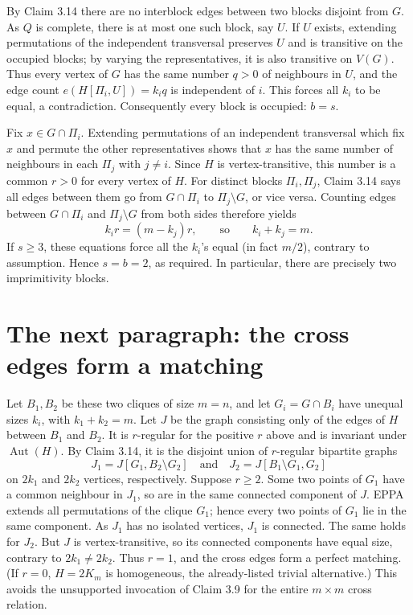 \documentclass[11pt,a4paper]{article}
\begin{document}
By Claim 3.14 there are no interblock edges between two
blocks disjoint from \(G\). As \(Q\) is complete,
there is at most one such block, say \(U\).
If \(U\) exists, extending permutations of the
independent transversal preserves \(U\) and is
transitive on the occupied blocks; by varying the
representatives, it is also transitive on \(V(G)\).
Thus every vertex of \(G\) has the same number
\(q>0\) of neighbours in \(U\), and the edge count
\(e(H[\Pi_i,U])=k_iq\) is independent of \(i\).
This forces all \(k_i\) to be equal, a contradiction.
Consequently every block is occupied: \(b=s\).

Fix \(x\in G\cap\Pi_i\). Extending permutations of an
independent transversal which fix \(x\) and permute the
other representatives shows that \(x\) has the same
number of neighbours in each \(\Pi_j\) with \(j\ne i\).
Since \(H\) is vertex-transitive, this number is a
common \(r>0\) for every vertex of \(H\).
For distinct blocks \(\Pi_i,\Pi_j\), Claim 3.14 says
all edges between them go from \(G\cap\Pi_i\) to
\(\Pi_j\setminus G\), or vice versa. Counting edges
between \(G\cap\Pi_i\) and \(\Pi_j\setminus G\)
from both sides therefore yields
\[
      k_i r=(m-k_j)r,\qquad\text{so}\qquad k_i+k_j=m.
\]
If \(s\ge3\), these equations force all the \(k_i\)'s
equal (in fact \(m/2\)), contrary to assumption.
Hence \(s=b=2\), as required. In particular, there
are precisely two imprimitivity blocks.

\section*{The next paragraph: the cross edges form a matching}

Let \(B_1,B_2\) be these two cliques of size
\(m=n\), and let \(G_i=G\cap B_i\) have unequal
sizes \(k_i\), with \(k_1+k_2=m\).
Let \(J\) be the graph consisting only of the edges
of \(H\) between \(B_1\) and \(B_2\).
It is \(r\)-regular for the positive \(r\) above
and is invariant under \(\operatorname{Aut}(H)\).
By Claim 3.14, it is the disjoint union of
\(r\)-regular bipartite graphs
\[
 J_1=J[G_1,B_2\setminus G_2]
 \quad\text{and}\quad
 J_2=J[B_1\setminus G_1,G_2]
\]
on \(2k_1\) and \(2k_2\) vertices, respectively.
Suppose \(r\ge2\). Some two points of \(G_1\)
have a common neighbour in \(J_1\), so are in
the same connected component of \(J\).
EPPA extends all permutations of the clique \(G_1\);
hence every two points of \(G_1\) lie in the same
component. As \(J_1\) has no isolated vertices,
\(J_1\) is connected. The same holds for \(J_2\).
But \(J\) is vertex-transitive, so its connected
components have equal size, contrary to
\(2k_1\ne2k_2\). Thus \(r=1\), and the
cross edges form a perfect matching.
(If \(r=0\), \(H=2K_m\) is homogeneous,
the already-listed trivial alternative.)
This avoids the unsupported invocation of Claim 3.9
for the entire \(m\times m\) cross relation.
\end{document}
